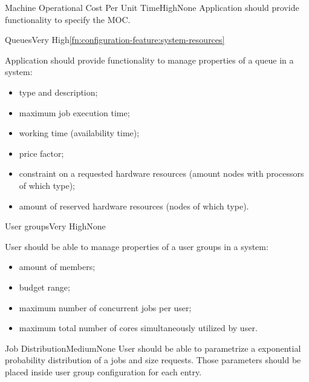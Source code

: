 	\begin{functional}{Machine Operational Cost Per Unit Time}{High}{None}
		\label{fn:configuration-feature:machine-opertional-cost-per-unit-time}
		{
			Application should provide functionality to specify the \gls{MOC}. 
		}
	\end{functional}

	\begin{functional}{Queues}{Very High}{\ref{fn:configuration-feature:system-resources}}
		\label{fn:configuration-feature:queues}
		{
			Application should provide functionality to manage properties of a queue in a system:
			\begin{itemize}
				\item type and description;
				\item maximum job execution time;
				\item working time (availability time);
				\item price factor;
				\item constraint on a requested hardware resources (amount nodes with processors of which type);
				\item amount of reserved hardware resources (nodes of which type).
			\end{itemize} 
		}
	\end{functional}

	\begin{functional}{User groups}{Very High}{None}
		\label{fn:configuration-feature:user-groups}
		{
			User should be able to manage properties of a user groups in a system:
			\begin{itemize}
				\item amount of members;
				\item budget range;
				\item maximum number of concurrent jobs per user;
				\item maximum total number of cores simultaneously utilized by user.
			\end{itemize} 
		}
	\end{functional}

	\begin{functional}{Job Distribution}{Medium}{None}
		\label{fn:configuration-feature:job-distribution}
		{
			User should be able to parametrize a exponential probability distribution of a jobs and size requests.
			Those parameters should be placed inside user group configuration for each entry. 
		}
	\end{functional}

